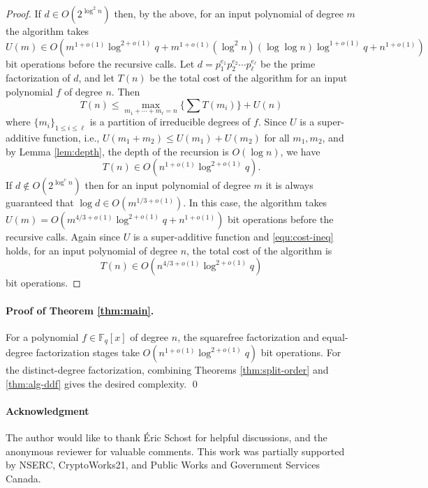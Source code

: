 \documentclass[11pt]{article}
\theoremstyle{plain}
\theoremstyle{definition}
\def\F{\ensuremath{\mathbb{F}}}
\begin{document}
\begin{proof}
	If $d \in O(2^{\log^2n})$ then, by the above, for an input polynomial of degree $m$ the 
	algorithm takes 
	\[ U(m) \in O(m^{1 + o(1)}\log^{2 + o(1)}q + m^{1 + o(1)}(\log^2n)(\log \log n)\log^{1 + o(1)}q 
	+ n^{1 + o(1)})
	\]
	bit operations before the recursive calls. Let $d = p_1^{e_1} p_2^{e_2} \cdots p_\ell^{e_\ell}$ 
	be the prime factorization of $d$, and let $T(n)$ be the total cost of the algorithm for an 
	input polynomial $f$ of degree $n$. Then
	\begin{equation}
	\label{equ:cost-ineq}
		T(n) \le \max_{m_1 + \cdots + m_\ell = n} \{ \sum T(m_i) \} + U(n)
	\end{equation}
	where $\{ m_i \}_{1 \le i \le \ell}$ is a partition of irreducible degrees of $f$. Since $U$ is 
	a super-additive function, i.e., $U(m_1 + m_2) \le U(m_1) + U(m_2)$ for all $m_1, m_2$, and by 
	Lemma \ref{lem:depth}, the depth of the recursion is $O(\log n)$, we have
	\[ T(n) \in O(n^{1 + o(1)} \log^{2 + o(1)}q). \]
	If $d \notin O(2^{\log^cn})$ then for an input polynomial of degree $m$ it is always guaranteed 
	that $\log d \in O(m^{1 / 3 + o(1)})$. In this case, the algorithm takes $U(m) = O(m^{4 / 3 + 
	o(1)} \log^{2 + o(1)}q  + n^{1 + o(1)})$ bit operations before the recursive calls. Again since 
	$U$ is a super-additive function and \eqref{equ:cost-ineq} holds, for an input polynomial of 
	degree $n$, the total cost of the algorithm is
	\[ T(n) \in O(n^{4 / 3 + o(1)} \log^{2 + o(1)}q) \]
	bit operations.
\end{proof}

\paragraph{Proof of Theorem \ref{thm:main}.}
For a polynomial $f \in \F_q[x]$ of degree $n$, the squarefree factorization and equal-degree 
factorization stages take $O(n^{1 + o(1)}\log^{2 + o(1)}q)$ bit operations. For the distinct-degree 
factorization, combining Theorems \ref{thm:split-order} and \ref{thm:alg-ddf} gives the desired 
complexity. \hfil \qed


\paragraph{Acknowledgment}
The author would like to thank \'Eric Schost for helpful discussions, and the anonymous reviewer for 
valuable comments. This work was partially supported by NSERC, CryptoWorks21, and Public Works and 
Government Services Canada.
\end{document}
